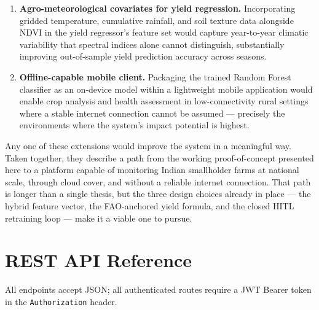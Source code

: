 \documentclass[12pt,a4paper,oneside]{report}
\begin{document}
\begin{enumerate}
  \item \textbf{Agro-meteorological covariates for yield regression.}
        Incorporating gridded temperature, cumulative rainfall, and soil texture
        data alongside NDVI in the yield regressor's feature set would capture
        year-to-year climatic variability that spectral indices alone cannot
        distinguish, substantially improving out-of-sample yield prediction
        accuracy across seasons.

  \item \textbf{Offline-capable mobile client.}
        Packaging the trained Random Forest classifier as an on-device model within
        a lightweight mobile application would enable crop analysis and health
        assessment in low-connectivity rural settings where a stable internet
        connection cannot be assumed — precisely the environments where the
        system's impact potential is highest.

\end{enumerate}

Any one of these extensions would improve the system in a meaningful way. Taken
together, they describe a path from the working proof-of-concept presented here
to a platform capable of monitoring Indian smallholder farms at national scale,
through cloud cover, and without a reliable internet connection. That path is longer
than a single thesis, but the three design choices already in place — the hybrid
feature vector, the FAO-anchored yield formula, and the closed HITL retraining
loop — make it a viable one to pursue.

\clearpage
{}



\appendix
\chapter{REST API Reference}
\label{app:api}

All endpoints accept JSON; all authenticated routes require a JWT Bearer token
in the \texttt{Authorization} header.
\end{document}
